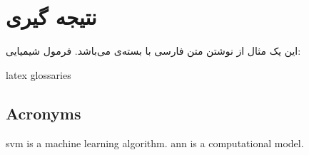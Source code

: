 \chapter{نتیجه گیری}

\clearpage

این یک مثال از نوشتن متن فارسی با بسته‌ی  می‌باشد.
فرمول شیمیایی: 

\begin{latin}
\gls{latex}
\gls{glossaries}
\section{Acronyms}
        \gls{svm} is a machine learning algorithm.
        \gls{ann} is a computational model.

\end{latin}

